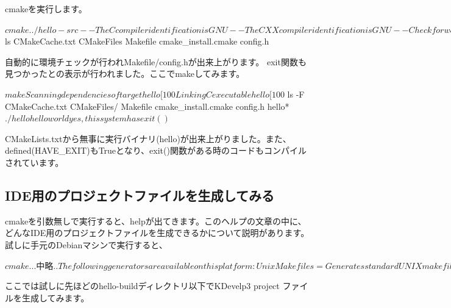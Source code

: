 \documentclass[mingoth,a4paper]{jsarticle}
\begin{document}
cmakeを実行します。

\begin{commandline}
$ cmake ../hello-src
-- The C compiler identification is GNU
-- The CXX compiler identification is GNU
-- Check for working C compiler: /usr/bin/gcc
-- Check for working C compiler: /usr/bin/gcc -- works
...中略...
-- Looking for exit
-- Looking for exit - found
-- Configuring done
-- Generating done
-- Build files have been written to: /.../cmake-test/hello-build
$ ls
CMakeCache.txt  CMakeFiles  Makefile  cmake_install.cmake  config.h
\end{commandline}

自動的に環境チェックが行われMakefile/config.hが出来上がります。
exit関数も見つかったとの表示が行われました。ここでmakeしてみます。

\begin{commandline}
$ make
Scanning dependencies of target hello
[100%
Linking C executable hello
[100%
$ ls -F
CMakeCache.txt  CMakeFiles/  Makefile  cmake_install.cmake  config.h  hello*
$ ./hello
hello world
yes, this system has exit()
$
\end{commandline}

CMakeLists.txtから無事に実行バイナリ(hello)が出来上がりました。また、defined(HAVE\_EXIT)もTrueとなり、exit()関数がある時のコードもコンパイルされています。

\subsection{IDE用のプロジェクトファイルを生成してみる}

cmakeを引数無しで実行すると、helpが出てきます。このヘルプの文章の中に、どんなIDE用のプロジェクトファイルを生成できるかについて説明があります。試しに手元のDebianマシンで実行すると、

\begin{commandline}
$ cmake
...中略..
The following generators are available on this platform:
  Unix Makefiles              = Generates standard UNIX makefiles.
  CodeBlocks - Unix Makefiles = Generates CodeBlocks project files.
  Eclipse CDT4 - Unix Makefiles
                              = Generates Eclipse CDT 4.0 project files.
  KDevelop3                   = Generates KDevelop 3 project files.
  KDevelop3 - Unix Makefiles  = Generates KDevelop 3 project files.
$
\end{commandline}

ここでは試しに先ほどのhello-buildディレクトリ以下でKDevelp3 project ファイルを生成してみます。
\end{document}
